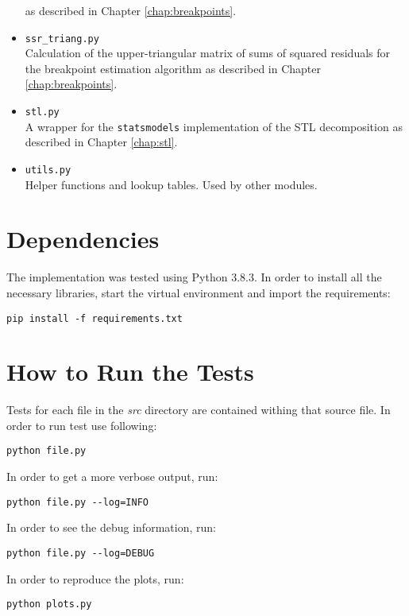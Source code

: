 \documentclass[main.tex]{subfiles}
\begin{document}
\begin{itemize}
  as described in Chapter \ref{chap:breakpoints}.
\item \texttt{ssr\_triang.py}\\
  Calculation of the upper-triangular matrix of sums of squared residuals for
  the breakpoint estimation algorithm as described in Chapter \ref{chap:breakpoints}.
\item \texttt{stl.py} \\
  A wrapper for the \texttt{statsmodels} \cite{statsmodels} implementation of the STL decomposition as
  described in Chapter \ref{chap:stl}.
\item \texttt{utils.py} \\
  Helper functions and lookup tables. Used by other modules. 
\end{itemize}

\section*{Dependencies}
\label{sec:deps}
The implementation was tested using Python 3.8.3.
In order to install all the necessary libraries, start the virtual environment and import
the requirements:
\begin{verbatim}
pip install -f requirements.txt
\end{verbatim}

\section*{How to Run the Tests}
\label{sec:source_code_overview}
Tests for each file in the \emph{src} directory are contained withing that
source file. In order to run test use following:
\begin{verbatim}
python file.py
\end{verbatim}
In order to get a more verbose output, run:
\begin{verbatim}
python file.py --log=INFO
\end{verbatim}
In order to see the debug information, run:
\begin{verbatim}
python file.py --log=DEBUG
\end{verbatim}
In order to reproduce the plots, run:
\begin{verbatim}
python plots.py
\end{verbatim}

\biblio
\end{document}
